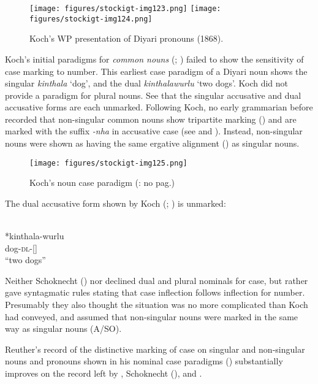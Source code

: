 \begin{figure}
\texttt{[image: figures/stockigt-img123.png]}
\texttt{[image: figures/stockigt-img124.png]}
\caption{Koch’s WP presentation of Diyari pronouns (1868).}
\label{bkm:Ref449369144}\label{fig:key:8-176}
\end{figure}

Koch’s initial paradigms for \textit{common nouns} (\citeyear{koch_untitled_1868}; ) failed to show the sensitivity of case marking to number. This earliest case paradigm of a Diyari noun shows the singular \textit{kinthala} `dog', and the dual \textit{kinthalawurlu} `two dogs'. Koch did not provide a paradigm for plural nouns. See that the singular accusative and dual accusative forms are each unmarked. Following Koch, no early grammarian before \citet{reuther_dieri_1894} recorded that non-singular common nouns show tripartite marking () and are marked with the suffix \textit{-nha} in accusative case (see  and ). Instead, non-singular nouns were shown as having the same ergative alignment () as singular nouns.


\begin{figure}
\texttt{[image: figures/stockigt-img125.png]}
\caption{Koch’s noun case paradigm (\citeyear{koch_untitled_1868}: no pag.)}
\label{bkm:Ref449369264}\label{fig:key:8-177}
\end{figure}

The dual accusative form shown by Koch (\citeyear[no pag.]{koch_untitled_1868}; ) is unmarked:

\ea
{} \\
*kinthala-wurlu \\
dog-\textsc{dl}-[]\\
\glt “two dogs” \z

Neither Schoknecht (\citeyear{schoknecht_grammar_1947}) nor \citet[10, 12]{flierl_dieri_1880} declined dual and plural nominals for case, but rather gave syntagmatic rules stating that case inflection follows inflection for number. Presumably they also thought the situation was no more complicated than Koch had conveyed, and assumed that non-singular nouns were marked in the same way as singular nouns (A/SO).

Reuther’s record of the distinctive marking of case on singular and non-singu\-lar nouns and pronouns shown in his nominal case paradigms () substantially improves on the record left by \citet{flierl_dieri_1880}, Schoknecht (\citeyear{schoknecht_grammar_1947}), and \citet{koch_untitled_1868}.


